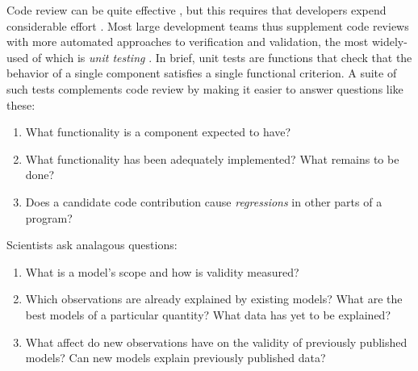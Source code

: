 \documentclass[9pt]{sig-alternate}
\begin{document}
Code review can be quite effective \cite{codereview}, but this requires that developers  expend considerable effort \cite{kemerer2009impact}. 
Most large development teams thus supplement code reviews with more {automated} approaches to verification and validation, the most widely-used  of which is \emph{unit testing} \cite{beck2003}. In brief, unit tests are functions that check that the behavior of a single component satisfies a single functional  criterion. 
A suite of such tests complements code review by making it easier to answer questions like these:
\begin{enumerate}
\item What functionality is a component expected to have?
\item What functionality has been adequately implemented? What remains to be done?
\item Does a candidate code contribution cause \emph{regressions} in other parts of a program?
\end{enumerate}
Scientists ask analagous questions:
\begin{enumerate}
\item What is a model's scope and how is validity measured?
\item Which observations are already explained by existing models? What are the best models of a particular quantity?  What data has yet to be explained?
\item What affect do new observations have on the validity of previously published models? Can new models explain previously published data?
\end{enumerate}
\end{document}
